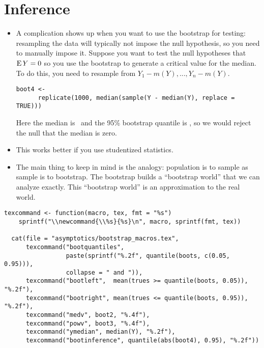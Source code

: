 \section{Inference}

\begin{itemize}

\item A complication shows up when you want to use the bootstrap for
  testing: resampling the data will typically not impose the null
  hypothesis, so you need to manually impose it.  Suppose you want to
  test the null hypotheses that $\operatorname{E} Y = 0$ so you use the bootstrap to
  generate a critical value for the median.  To do this, you need to
  resample from $Y_1 - m(Y),...,Y_n - m(Y)$.
  \begin{lstlisting}[firstline=2,gobble=6]
    boot4 <-
      replicate(1000, median(sample(Y - median(Y), replace = TRUE)))
  \end{lstlisting}
  Here the median is \ymedian\ and the 95\% bootstrap quantile is
  \bootinference, so we would reject the null that the median is zero.

\item This works better if you use studentized statistics.
  
\item The main thing to keep in mind is the analogy: population is to
  sample as sample is to bootstrap.  The bootstrap builds a
  ``bootstrap world'' that we can analyze exactly.  This ``bootstrap
  world'' is an approximation to the real world.

\end{itemize}

\begin{lstlisting}[print=false]
  texcommand <- function(macro, tex, fmt = "%s")
    sprintf("\\newcommand{\\%s}{%s}\n", macro, sprintf(fmt, tex))

  cat(file = "asymptotics/bootstrap_macros.tex",
      texcommand("bootquantiles",
                 paste(sprintf("%.2f", quantile(boots, c(0.05, 0.95))),
                 collapse = " and ")),
      texcommand("bootleft",  mean(trues >= quantile(boots, 0.05)), "%.2f"),
      texcommand("bootright", mean(trues <= quantile(boots, 0.95)), "%.2f"),
      texcommand("medv", boot2, "%.4f"),
      texcommand("powv", boot3, "%.4f"),
      texcommand("ymedian", median(Y), "%.2f"),
      texcommand("bootinference", quantile(abs(boot4), 0.95), "%.2f"))
\end{lstlisting}

